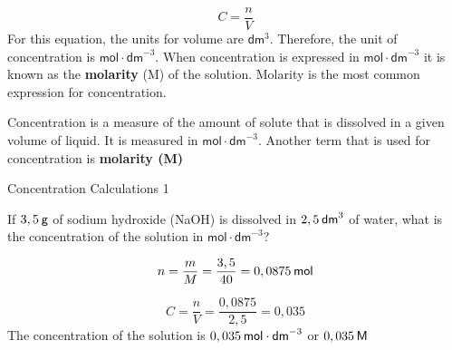     \begin{equation}
    C=\frac{n}{V}
      \end{equation}
      \label{m38712*id282881}For this equation, the units for volume are $\mathsf{dm}{}^{3}$. Therefore, the unit of concentration is $\mathsf{mol}\ensuremath{\cdot}{\mathsf{dm}}^{-3}$.
When concentration is expressed in $\mathsf{mol}\ensuremath{\cdot}{\mathsf{dm}}^{-3}$ it is known as the \textbf{molarity} (M) of the solution. Molarity is the most common expression for concentration.\par 
\label{m38712*notfhsst!!!underscore!!!id1649}
	\par
\label{m38712*fhsst!!!underscore!!!id1650}
 { \label{m38712*meaningfhsst!!!underscore!!!id1650}
      \label{m38712*id282955}Concentration is a measure of the amount of solute that is dissolved in a given volume of liquid. It is measured in $\mathsf{mol}\ensuremath{\cdot}{\mathsf{dm}}^{-3}$. Another term that is used for concentration is \textbf{molarity (M)} \par 
       } 
\par
            \label{m38712*secfhsst!!!underscore!!!id1653}\vspace{.5cm} 
      \noindent
      \begin{wex}{ Concentration Calculations 1 }
{
      \label{m38712*probfhsst!!!underscore!!!id1654}
      \label{m38712*id283003}If $3,5\phantom{\rule{2pt}{0ex}}\mathsf{g}$ of sodium hydroxide (NaOH) is dissolved in $2,5\phantom{\rule{2pt}{0ex}}{\mathsf{dm}}^{3}$ of water, what is the concentration of the solution in $\mathsf{mol}\ensuremath{\cdot}{\mathsf{dm}}^{-3}$?\par 
      \vspace{5pt}}
{
      \label{m38712*id283067}\nopagebreak\noindent{}
    \begin{equation}
    n=\frac{m}{M}=\frac{3,5}{40}=0,0875\phantom{\rule{2pt}{0ex}}\mathsf{mol}
      \end{equation}
      \label{m38712*id283121}\nopagebreak\noindent{}
        
    \begin{equation}
    C=\frac{n}{V}=\frac{0,0875}{2,5}=0,035
      \end{equation}
      \label{m38712*id283169}The concentration of the solution is $0,035\phantom{\rule{2pt}{0ex}}\mathsf{mol}\ensuremath{\cdot}{\mathsf{dm}}^{-3}$ or $0,035\phantom{\rule{2pt}{0ex}}\mathsf{M}$
 \par 
}
    \end{wex}

